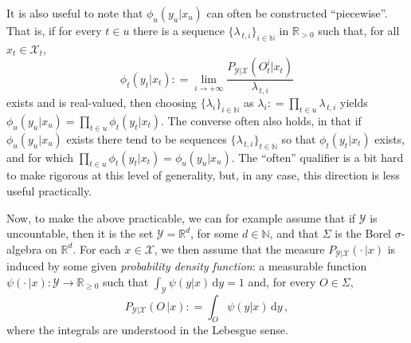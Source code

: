 \documentclass[twoside,11pt]{article}
\newcommand{\nats}{\mathbb{N}}
\newcommand{\reals}{\mathbb{R}}
\newcommand{\realspos}{\reals_{>0}}
\newcommand{\realsnonneg}{\reals_{\geq 0}}
\newcommand{\states}{\mathcal{X}}
\newcommand{\observs}{\mathcal{Y}}
\newcommand{\coloneqq}{:\!=}
\begin{document}
It is also useful to note that $\phi_u(y_u\vert x_u)$ can often be constructed ``piecewise''. That is, if for every $t\in u$ there is a sequence $\{\lambda_{\,t,i}\}_{i\in\nats}$ in $\realspos$ such that, for all $x_t\in\states_t$,
\begin{equation*}
\phi_t(y_t\vert x_t)\coloneqq \lim_{i\to+\infty} \frac{P_{\observs\vert\states}(O_t^i\vert x_t)}{\lambda_{\,t,i}}
\end{equation*}
exists and is real-valued, then choosing $\{\lambda_i\}_{i\in\nats}$ as $\lambda_i\coloneqq \prod_{t\in u}\lambda_{\,t,i}$ yields $\phi_u(y_u\vert x_u)=\prod_{t\in u}\phi_t(y_t\vert x_t)$. The converse often also holds, in that if $\phi_u(y_u\vert x_u)$ exists there tend to be sequences $\{\lambda_{\,t,i}\}_{t\in\nats}$ so that $\phi_t(y_t\vert x_t)$ exists, and for which $\prod_{t\in u}\phi_t(y_t\vert x_t)=\phi_u(y_u\vert x_u)$. The ``often'' qualifier is a bit hard to make rigorous at this level of generality, but, in any case, this direction is less useful practically. %

Now, to make the above practicable, we can for example assume that if $\observs$ is uncountable, then it is the set $\observs=\reals^d$, for some $d\in\nats$, and that $\Sigma$ is the Borel $\sigma$-algebra on $\reals^d$. 
For each $x\in\states$, we then assume that the measure $P_{\observs\vert\states}(\cdot\,\vert x)$ is induced by some given \emph{probability density function}: a measurable function $\psi(\cdot\,\vert x):\observs\to\realsnonneg$ such that $\int_\observs \psi(y\vert x)\,\mathrm{d}y=1$ and, for every $O\in\Sigma$,
\begin{equation*}
P_{\observs\vert\states}(O\,\vert x) \coloneqq \int_O \psi(y\vert x)\,\mathrm{d}y\,,
\end{equation*}
where the integrals are understood in the Lebesgue sense.
\end{document}
